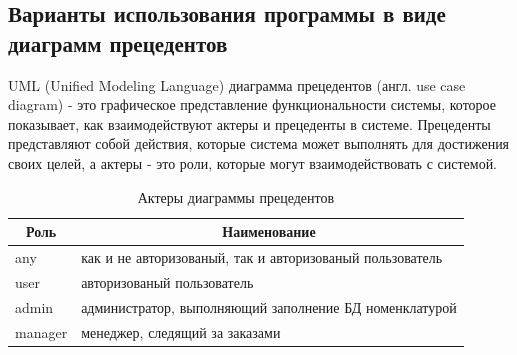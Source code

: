 \subsection*{Варианты использования программы в виде диаграмм прецедентов}

UML (Unified Modeling Language) диаграмма прецедентов (англ. use case diagram) - это графическое представление функциональности системы, которое показывает,
как взаимодействуют актеры и прецеденты в системе.
Прецеденты представляют собой действия, которые система может выполнять для достижения своих целей,
а актеры - это роли, которые могут взаимодействовать с системой.

\begin{table}[!htb]
    \centering

    \caption{Актеры диаграммы прецедентов}
    \label{tab:use_case_roles}

    \begin{tabular}{|p{2cm}|p{15cm}|}
        \hline
        \multicolumn{1}{|c|}{Роль}
        & \multicolumn{1}{c|}{Наименование}
        \\ \hline

        any & как и не авторизованый, так и авторизованый пользователь \\ \hline 
        user & авторизованый пользователь \\ \hline 
        admin & администратор, выполняющий заполнение БД номенклатурой \\ \hline 
        manager & менеджер, следящий за заказами \\ \hline 
    \end{tabular}
\end{table}




